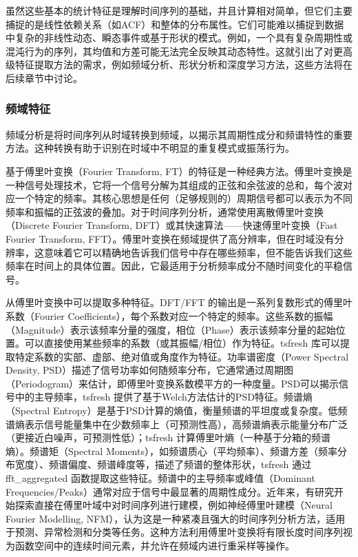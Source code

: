虽然这些基本的统计特征是理解时间序列的基础，并且计算相对简单，但它们主要捕捉的是线性依赖关系（如ACF）和整体的分布属性。它们可能难以捕捉到数据中复杂的非线性动态、瞬态事件或基于形状的模式。例如，一个具有复杂周期性或混沌行为的序列，其均值和方差可能无法完全反映其动态特性。这就引出了对更高级特征提取方法的需求，例如频域分析、形状分析和深度学习方法，这些方法将在后续章节中讨论。

        \subsubsection{频域特征}
            \label{sec:ts_statistical_spectral}
频域分析是将时间序列从时域转换到频域，以揭示其周期性成分和频谱特性的重要方法。这种转换有助于识别在时域中不明显的重复模式或振荡行为。

基于傅里叶变换（Fourier Transform, FT）的特征是一种经典方法。傅里叶变换是一种信号处理技术，它将一个信号分解为其组成的正弦和余弦波的总和，每个波对应一个特定的频率。其核心思想是任何（足够规则的）周期信号都可以表示为不同频率和振幅的正弦波的叠加。对于时间序列分析，通常使用离散傅里叶变换（Discrete Fourier Transform, DFT）或其快速算法——快速傅里叶变换（Fast Fourier Transform, FFT）。傅里叶变换在频域提供了高分辨率，但在时域没有分辨率，这意味着它可以精确地告诉我们信号中存在哪些频率，但不能告诉我们这些频率在时间上的具体位置。因此，它最适用于分析频率成分不随时间变化的平稳信号。

从傅里叶变换中可以提取多种特征。DFT/FFT 的输出是一系列复数形式的傅里叶系数（Fourier Coefficients），每个系数对应一个特定的频率。这些系数的振幅（Magnitude）表示该频率分量的强度，相位（Phase）表示该频率分量的起始位置。可以直接使用某些频率的系数（或其振幅/相位）作为特征。tsfresh 库可以提取特定系数的实部、虚部、绝对值或角度作为特征。功率谱密度（Power Spectral Density, PSD）描述了信号功率如何随频率分布，它通常通过周期图（Periodogram）来估计，即傅里叶变换系数模平方的一种度量。PSD可以揭示信号中的主导频率，tsfresh 提供了基于Welch方法估计的PSD特征。频谱熵（Spectral Entropy）是基于PSD计算的熵值，衡量频谱的平坦度或复杂度。低频谱熵表示信号能量集中在少数频率上（可预测性高），高频谱熵表示能量分布广泛（更接近白噪声，可预测性低）；tsfresh 计算傅里叶熵（一种基于分箱的频谱熵）。频谱矩（Spectral Moments），如频谱质心（平均频率）、频谱方差（频率分布宽度）、频谱偏度、频谱峰度等，描述了频谱的整体形状，tsfresh 通过 fft\_aggregated 函数提取这些特征。频谱中的主导频率或峰值（Dominant Frequencies/Peaks）通常对应于信号中最显著的周期性成分。近年来，有研究开始探索直接在傅里叶域中对时间序列进行建模，例如神经傅里叶建模（Neural Fourier Modelling, NFM），认为这是一种紧凑且强大的时间序列分析方法，适用于预测、异常检测和分类等任务。这种方法利用傅里叶变换将有限长度时间序列视为函数空间中的连续时间元素，并允许在频域内进行重采样等操作。

